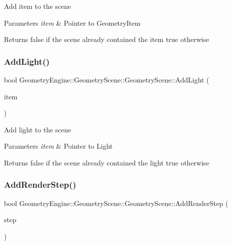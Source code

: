 Add item to the scene 
\begin{DoxyParams}{Parameters}
{\em item} & Pointer to Geometry\+Item \\
\hline
\end{DoxyParams}
\begin{DoxyReturn}{Returns}
false if the scene already contained the item true otherwise 
\end{DoxyReturn}
\mbox{\label{class_geometry_engine_1_1_geometry_scene_1_1_geometry_scene_adde250133889e145473064d276e96583}} 
\subsubsection{\texorpdfstring{AddLight()}{AddLight()}}
{\footnotesize\ttfamily bool Geometry\+Engine\+::\+Geometry\+Scene\+::\+Geometry\+Scene\+::\+Add\+Light (\begin{DoxyParamCaption}\item[{\mbox{\hyperlink{class_geometry_engine_1_1_geometry_world_item_1_1_geometry_light_1_1_light}{Geometry\+World\+Item\+::\+Geometry\+Light\+::\+Light}} $\ast$}]{item }\end{DoxyParamCaption})\hspace{0.3cm}{\ttfamily [virtual]}}

Add light to the scene 
\begin{DoxyParams}{Parameters}
{\em item} & Pointer to Light \\
\hline
\end{DoxyParams}
\begin{DoxyReturn}{Returns}
false if the scene already contained the light true otherwise 
\end{DoxyReturn}
\mbox{\label{class_geometry_engine_1_1_geometry_scene_1_1_geometry_scene_ada6f2a88a6e7962200a12e5083f8c055}} 
\subsubsection{\texorpdfstring{AddRenderStep()}{AddRenderStep()}}
{\footnotesize\ttfamily bool Geometry\+Engine\+::\+Geometry\+Scene\+::\+Geometry\+Scene\+::\+Add\+Render\+Step (\begin{DoxyParamCaption}\item[{const \mbox{\hyperlink{class_geometry_engine_1_1_geometry_render_step_1_1_render_step}{Geometry\+Render\+Step\+::\+Render\+Step}} \&}]{step }\end{DoxyParamCaption})\hspace{0.3cm}{\ttfamily [virtual]}}

